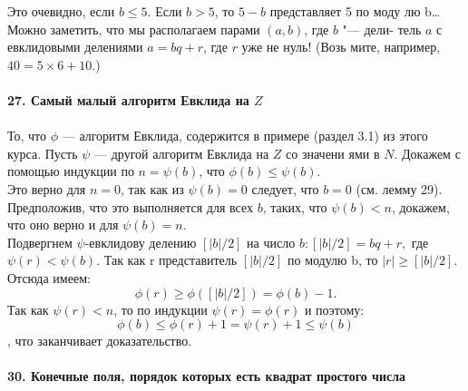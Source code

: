 \documentclass{../../template/mai_book}
\begin{document}

\hspace*{15pt}Это очевидно, если $b \leq 5$. Если $b > 5$,  то $5 - b$  представляет 5 по моду­\linebreak
лю b\ldots\\

\hspace*{0pt}Можно заметить, что мы располагаем парами $(a,b)$, где $b$ "--- дели-\linebreak
тель $a$  с евклидовыми делениями $a = bq + r$, где $r$ уже не нуль! (Возь­\linebreak
мите, например, $40 = 5 \times 6 + 10$.)\\
\\
\noindent\textbf{27. Самый малый алгоритм Евклида на $Z$}\\
\\
\hspace*{15pt} То, что $\phi$ ---  алгоритм Евклида, содержится в примере (раздел 3.1)\linebreak
из этого курса. Пусть $\psi$ --- другой алгоритм Евклида на $Z$  со значени­\linebreak
ями в $N$. Докажем с помощью индукции по $n =\psi(b)$, что $\phi(b) \leq \psi(b)$.\\
\hspace*{15pt} Это верно для $n = 0$, так как из $\psi(b) = 0$ следует, что $b = 0$\linebreak
(см. лемму 29). Предположив, что это выполняется для всех $b$, таких,\linebreak
что $\psi(b) < n$,  докажем, что оно верно и для $\psi(b) = n$.\\
\hspace*{15pt} Подвергнем $\psi$-евклидову делению $[|b|/2]$ на число $b:[|b|/2] = bq+r,$\linebreak
где $\psi(r) < \psi(b)$. Так как r  представитель $[|b|/2]$ по модулю  b, то \linebreak
$|r| \geq [|b|/2]$. Отсюда имеем: 
$$\phi(r) \geq \phi([|b|/2]) = \phi(b) - 1.$$
Так как $\psi(r) < n$, то по индукции $\psi(r) = \phi(r)$ и поэтому:
$$\phi(b) \leq \phi(r) + 1 = \psi(r) + 1 \leq \psi(b)$$,
что заканчивает доказательство.\\
\\
\noindent\textbf{30. Конечные поля, порядок которых есть квадрат\linebreak
простого числа}\\
\end{document}
